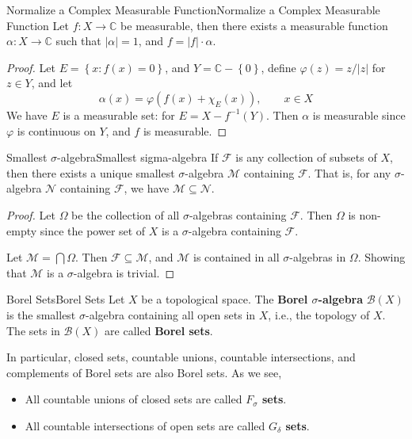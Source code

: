 \documentclass[../main.tex]{subfiles}
\begin{document}
\begin{proposition}{Normalize a Complex Measurable Function}{Normalize a Complex Measurable Function}
	Let $f: X \rightarrow \mathbb{C}$ be measurable, then there exists a measurable function $\alpha: X \rightarrow \mathbb{C}$ such that $\left|\alpha\right| = 1$, and $f = |f| \cdot \alpha$.
\end{proposition}
\begin{proof}
Let $E = \left\{ x:f(x)=0 \right\}$, and $Y = \mathbb{C}-\left\{ 0 \right\}$, define $\varphi(z) = z / \left|z\right|$ for $z\in Y$, and let
\begin{equation*}
\alpha(x) = \varphi(f(x) + \chi_E(x)), \qquad x\in X
\end{equation*}
We have $E$ is a measurable set: for $E = X-f^{-1}(Y)$. Then $\alpha$ is measurable since $\varphi$ is continuous on $Y$, and $f$ is measurable.
\end{proof}

\begin{theorem}{Smallest $\sigma$-algebra}{Smallest sigma-algebra}
	If $\mathcal{F}$ is any collection of subsets of $X$, then there exists a unique smallest $\sigma$-algebra $\mathcal{M}$ containing $\mathcal{F}$. That is, for any $\sigma$-algebra $\mathcal{N}$ containing $\mathcal{F}$, we have $\mathcal{M} \subseteq \mathcal{N}$.
\end{theorem}
\begin{proof}
	Let $\Omega$ be the collection of all $\sigma$-algebras containing $\mathcal{F}$. Then $\Omega$ is non-empty since the power set of $X$ is a $\sigma$-algebra containing $\mathcal{F}$.

	Let $\mathcal{M} = \bigcap \Omega$. Then $\mathcal{F} \subseteq \mathcal{M}$, and $\mathcal{M}$ is contained in all $\sigma$-algebras in $\Omega$. Showing that $\mathcal{M}$ is a $\sigma$-algebra is trivial.
\end{proof}

\begin{definition}{Borel Sets}{Borel Sets}
	Let $X$ be a topological space. The \textbf{Borel $\sigma$-algebra} $\mathcal{B}(X)$ is the smallest $\sigma$-algebra containing all open sets in $X$, i.e., the topology of $X$. The sets in $\mathcal{B}(X)$ are called \textbf{Borel sets}.
\end{definition}
In particular, closed sets, countable unions, countable intersections, and complements of Borel sets are also Borel sets. As we see,
\begin{itemize}
	\item All countable unions of closed sets are called \textbf{$F_{\sigma}$ sets}.
	\item All countable intersections of open sets are called \textbf{$G_{\delta}$ sets}.
\end{itemize}
\end{document}
